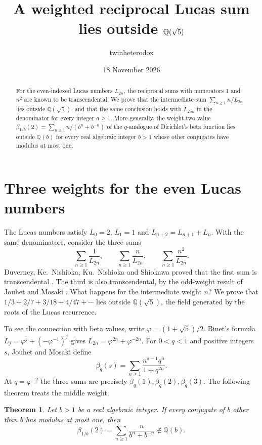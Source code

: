 \documentclass[11pt,letterpaper]{article}
\title{\Large A weighted reciprocal Lucas sum lies outside \(\Q(\sqrt5)\)}
\author{twinheterodox}
\date{18 November 2026}
\newcommand{\Q}{\mathbb Q}
\newtheorem{theorem}{Theorem}
\begin{document}
\maketitle
\begin{abstract}
For the even-indexed Lucas numbers \(L_{2n}\), the reciprocal sums with
numerators \(1\) and \(n^2\) are known to be transcendental. We prove
that the intermediate sum \(\sum_{n\ge1}n/L_{2n}\) lies outside
\(\Q(\sqrt5)\), and that the same conclusion holds with \(L_{2an}\) in
the denominator for every integer \(a\ge1\). More generally, the
weight-two value \(\beta_{1/b}(2)=\sum_{n\ge1}n/(b^n+b^{-n})\) of the
\(q\)-analogue of Dirichlet's beta function lies outside \(\Q(b)\) for
every real algebraic integer \(b>1\) whose other conjugates have modulus
at most one.
\end{abstract}

\section{Three weights for the even Lucas numbers}
The Lucas numbers satisfy \(L_0=2\), \(L_1=1\) and
\(L_{n+2}=L_{n+1}+L_n\). With the same denominators, consider the three sums
\[
 \sum_{n\ge1}\frac{1}{L_{2n}},\qquad
 \sum_{n\ge1}\frac{n}{L_{2n}},\qquad
 \sum_{n\ge1}\frac{n^2}{L_{2n}}.
\]
Duverney, Ke.~Nishioka, Ku.~Nishioka and Shiokawa proved that the first
sum is transcendental \cite[p.~97 of the Kyoto account]{dnns}. The
third is also transcendental, by the odd-weight result of Jouhet and
Mosaki \cite[\S1, (1.1) and the discussion before Theorem~1.1]{jm}.
What happens for the intermediate weight \(n\)? We prove that
\(1/3+2/7+3/18+4/47+\cdots\) lies outside \(\Q(\sqrt5)\), the field
generated by the roots of the Lucas recurrence.

To see the connection with beta values, write \(\varphi=(1+\sqrt5)/2\).
Binet's formula \(L_j=\varphi^j+(-\varphi^{-1})^j\) gives
\(L_{2n}=\varphi^{2n}+\varphi^{-2n}\).
For \(0<q<1\) and positive integers \(s\), Jouhet and Mosaki define
\[
 \beta_q(s)=\sum_{n\ge1}\frac{n^{s-1}q^n}{1+q^{2n}} .
\]
At \(q=\varphi^{-2}\) the three sums are precisely
\(\beta_q(1),\beta_q(2),\beta_q(3)\). The following theorem treats
the middle weight.

\begin{theorem}\label{thm:bases}
Let \(b>1\) be a real algebraic integer. If every conjugate of \(b\)
other than \(b\) has modulus at most one, then
\[
       \beta_{1/b}(2)=\sum_{n\ge1}\frac{n}{b^n+b^{-n}}\notin\Q(b).
\]
\end{theorem}
\end{document}
